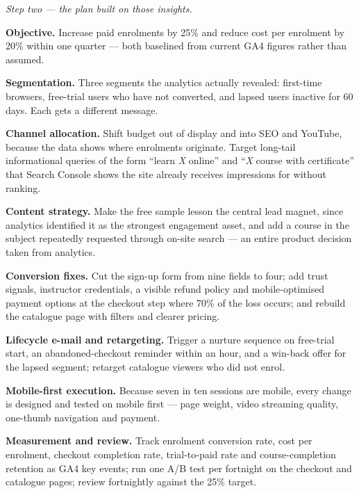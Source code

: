 \begin{qlist}
\textit{Step two --- the plan built on those insights.}
\begin{apts}
\item \textbf{Objective.} Increase paid enrolments by 25\% and reduce cost per
      enrolment by 20\% within one quarter --- both baselined from current GA4
      figures rather than assumed.
\item \textbf{Segmentation.} Three segments the analytics actually revealed:
      first-time browsers, free-trial users who have not converted, and lapsed
      users inactive for 60 days. Each gets a different message.
\item \textbf{Channel allocation.} Shift budget out of display and into SEO and
      YouTube, because the data shows where enrolments originate. Target
      long-tail informational queries of the form ``learn \emph{X} online'' and
      ``\emph{X} course with certificate'' that Search Console shows the site
      already receives impressions for without ranking.
\item \textbf{Content strategy.} Make the free sample lesson the central lead
      magnet, since analytics identified it as the strongest engagement asset,
      and add a course in the subject repeatedly requested through on-site
      search --- an entire product decision taken from analytics.
\item \textbf{Conversion fixes.} Cut the sign-up form from nine fields to
      four; add trust signals, instructor credentials, a visible refund policy
      and mobile-optimised payment options at the checkout step where 70\% of
      the loss occurs; and rebuild the catalogue page with filters and clearer
      pricing.
\item \textbf{Lifecycle e-mail and retargeting.} Trigger a nurture sequence on
      free-trial start, an abandoned-checkout reminder within an hour, and a
      win-back offer for the lapsed segment; retarget catalogue viewers who did
      not enrol.
\item \textbf{Mobile-first execution.} Because seven in ten sessions are
      mobile, every change is designed and tested on mobile first --- page
      weight, video streaming quality, one-thumb navigation and payment.
\item \textbf{Measurement and review.} Track enrolment conversion rate, cost
      per enrolment, checkout completion rate, trial-to-paid rate and
      course-completion retention as GA4 key events; run one A/B test per
      fortnight on the checkout and catalogue pages; review fortnightly against
      the 25\% target.
\end{apts}


\end{qlist}
